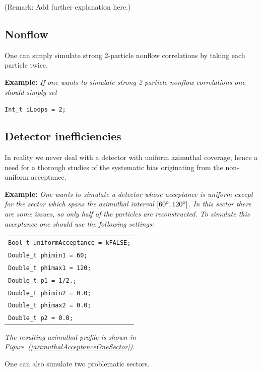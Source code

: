 \documentclass[a4paper]{book}
\numberwithin{equation}{subsection}
\begin{document}
(Remark: Add further explanation here.)

\subsection{Nonflow}
One can simply simulate strong 2-particle nonflow correlations by taking each particle twice.  

\vspace{0.5cm}
\noindent\textbf{Example:} \textit{If one wants to simulate strong 2-particle nonflow correlations one should simply set}
%
\begin{center}
\texttt{Int\_t iLoops = 2;}
\end{center}
%
\vspace{0.5cm}

\subsection{Detector inefficiencies}
In reality we never deal with a detector with uniform azimuthal coverage, hence a need for a thorough studies of the systematic bias originating from the non-uniform acceptance.

\vspace{0.5cm}
\noindent\textbf{Example:} \textit{One wants to simulate a detector whose acceptance is uniform except for the sector which spans the azimuthal interval $[60^{\rm o},120^{\rm o}]$. In this sector there are some issues, so only half of the particles are reconstructed. To simulate this acceptance one should use the following settings:}
%
\begin{center}
\begin{tabular}[t]{l}
\texttt{Bool\_t uniformAcceptance = kFALSE;} \\
\texttt{Double\_t phimin1 = 60;} \\
\texttt{Double\_t phimax1 = 120;} \\
\texttt{Double\_t p1 = 1/2.;} \\
\texttt{Double\_t phimin2 = 0.0;} \\
\texttt{Double\_t phimax2 = 0.0;} \\
\texttt{Double\_t p2 = 0.0;} 
\end{tabular}
\end{center}
%
\textit{The resulting azimuthal profile is shown in Figure~(\ref{azimuthalAcceptanceOneSector})}.
\vspace{0.5cm}

\noindent One can also simulate two problematic sectors.
\end{document}
